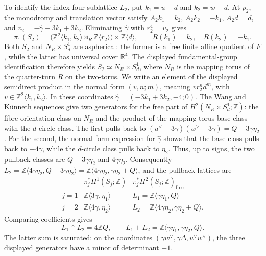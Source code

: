 \documentclass[11pt]{article}
\theoremstyle{definition}
\theoremstyle{remark}
\numberwithin{equation}{section}
\begin{document}
To identify the index-four sublattice $L_2$, put
$k_1=u-d$ and $k_2=w-d$.  At $p_2$, the monodromy and translation
vector satisfy $A_2k_1=k_2$, $A_2k_2=-k_1$, $A_2d=d$, and
$v_2=-\widehat\gamma-3k_1+3k_2$.
Eliminating $\widehat\gamma$ with $r_2^4=v_2$ gives
\begin{equation}\label{eq:order-four-product-model}
 \pi_1(S_2)=
 \bigl(\mathbb Z^2\langle k_1,k_2\rangle
       \rtimes_R\mathbb Z\langle r_2\rangle\bigr)
 \times\mathbb Z\langle d\rangle,
 \qquad R(k_1)=k_2,\quad R(k_2)=-k_1.
\end{equation}
Both $S_2$ and $N_R\times S^1_d$ are aspherical: the former is a free
finite affine quotient of $F$, while the latter has universal cover
$\mathbb R^4$.  The displayed fundamental-group identification therefore
yields $S_2\simeq N_R\times S^1_d$, where $N_R$ is the mapping torus of
the quarter-turn $R$ on the two-torus.  We write an element of the displayed
semidirect product in the normal form $(v,n;m)$, meaning
$v r_2^n d^m$, with $v\in\mathbb Z^2\langle k_1,k_2\rangle$.
In these coordinates
$\widehat\gamma=(-3k_1+3k_2,-4;0)$.
The Wang and K\"unneth sequences give two generators for the free part of
$H^2(N_R\times S^1_d;\mathbb Z)$: the fibre-orientation class on $N_R$
and the product of the mapping-torus base class with the $d$-circle class.
The first pulls back to
$(u^\vee-3\gamma)(w^\vee+3\gamma)=Q-3\gamma\eta_2$.  For the second, the
normal-form expression for $\widehat\gamma$ shows that the base class pulls
back to $-4\gamma$, while the $d$-circle class pulls back to $\eta_2$.
Thus, up to signs, the two pullback classes are
$Q-3\gamma\eta_2$ and $4\gamma\eta_2$.
Consequently
$L_2=\mathbb Z\langle4\gamma\eta_2,Q-3\gamma\eta_2\rangle
=\mathbb Z\langle4\gamma\eta_2,\gamma\eta_2+Q\rangle$, and the pullback lattices are
\begin{equation*}
\begin{array}{c|c|c}
 &\pi_j^*H^1(S_j;\mathbb Z)
 &\pi_j^*H^2(S_j;\mathbb Z)_{\mathrm{free}}\\ \hline
j=1&\mathbb Z\langle3\gamma,\eta_1\rangle
   &L_1=\mathbb Z\langle \gamma\eta_1,Q\rangle\\
j=2&\mathbb Z\langle4\gamma,\eta_2\rangle
   &L_2=\mathbb Z\langle4\gamma\eta_2,\gamma\eta_2+Q\rangle.
\end{array}
\end{equation*}
Comparing coefficients gives
\begin{equation}\label{eq:finite-fibre-lattice-arithmetic}
 L_1\cap L_2=4\mathbb ZQ,
 \qquad
 L_1+L_2=\mathbb Z\langle\gamma\eta_1,\gamma\eta_2,Q\rangle.
\end{equation}
The latter sum is saturated: on the coordinates
$(\gamma w^\vee,\gamma\Delta,u^\vee w^\vee)$, the three displayed generators have a
minor of determinant $-1$.
\end{document}
